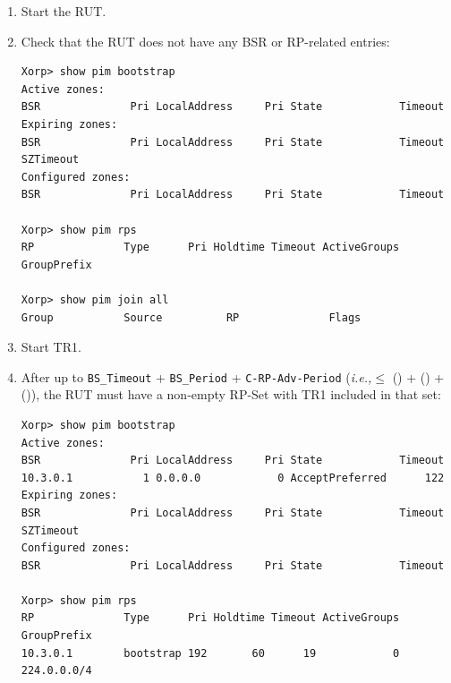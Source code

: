 \documentclass[11pt]{report}
\newcommand{\ie}{\emph{i.e.,}\xspace}
\begin{document}
\begin{enumerate}

  \item Start the RUT.

  \item Check that the RUT does not have any BSR or RP-related entries:

\begin{verbatim}
Xorp> show pim bootstrap
Active zones:
BSR              Pri LocalAddress     Pri State            Timeout
Expiring zones:
BSR              Pri LocalAddress     Pri State            Timeout SZTimeout
Configured zones:
BSR              Pri LocalAddress     Pri State            Timeout

Xorp> show pim rps
RP              Type      Pri Holdtime Timeout ActiveGroups GroupPrefix

Xorp> show pim join all
Group           Source          RP              Flags

\end{verbatim}

  \item Start TR1.

  \item After up to \verb=BS_Timeout= + \verb=BS_Period= +
        \verb=C-RP-Adv-Period=
        (\ie $\leq$ ({\PimsmBSTimeout}) + ({\PimsmBSTimeout}) +
        ({\PimsmCRPAdvPeriod})), the RUT must have a non-empty RP-Set
        with TR1 included in that set:

\begin{verbatim}
Xorp> show pim bootstrap
Active zones:
BSR              Pri LocalAddress     Pri State            Timeout
10.3.0.1           1 0.0.0.0            0 AcceptPreferred      122
Expiring zones:
BSR              Pri LocalAddress     Pri State            Timeout SZTimeout
Configured zones:
BSR              Pri LocalAddress     Pri State            Timeout

Xorp> show pim rps
RP              Type      Pri Holdtime Timeout ActiveGroups GroupPrefix
10.3.0.1        bootstrap 192       60      19            0 224.0.0.0/4


\end{verbatim}
\end{enumerate}
\end{document}
